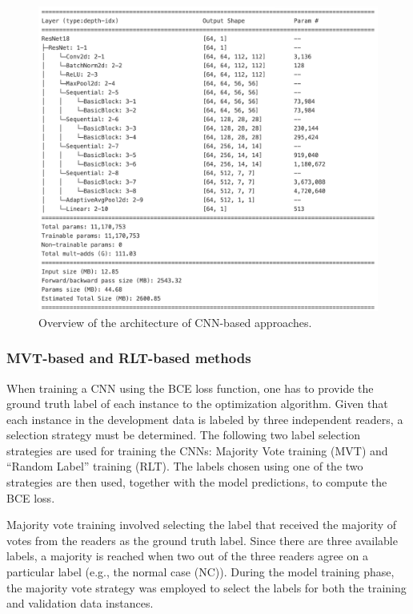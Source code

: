 \begin{figure}[t]
  \centering
  \includegraphics[width=1.0\textwidth]{content/figures/cnn_architecture.png}
  \caption{Overview of the architecture of CNN-based approaches.} 
  \label{fig:resnet}
\end{figure} 

\subsubsection{MVT-based and RLT-based methods}
\label{subsubsec:cnn_based_classification_mvt_rlt}

When training a CNN using the BCE loss function, 
one has to provide the ground truth label of each instance to the optimization algorithm.
Given that each instance in the development data is labeled by three independent readers, 
a selection strategy must be determined.
The following two label selection strategies are used for training the CNNs: 
Majority Vote training (MVT) and “Random Label” training (RLT).
The labels chosen using one of the two strategies are then used, together with the model predictions, 
to compute the BCE loss.

Majority vote training involved selecting the label that received the majority of votes from the readers as the 
ground truth label.
Since there are three available labels, 
a majority is reached when two out of the three readers agree on a particular label (e.g., the normal case (NC)).
During the model training phase, the majority vote strategy was employed to select the labels for both the training 
and validation data instances.

